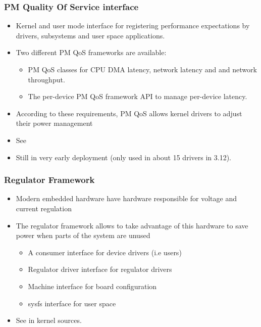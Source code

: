 \begin{frame}
  \frametitle{PM Quality Of Service interface}
  \begin{itemize}
  \item Kernel and user mode interface for registering
        performance expectations by drivers, subsystems and user space
        applications.
  \item Two different PM QoS frameworks are available:
    \begin{itemize}
       \item PM QoS classes for CPU DMA latency, network latency and
             and network throughput.
       \item The per-device PM QoS framework API to manage per-device
	     latency.
    \end{itemize}
  \item According to these requirements, PM QoS allows kernel drivers
        to adjust their power management
  \item See 
  \item Still in very early deployment (only used in about 15 drivers in
        3.12).
  \end{itemize}
\end{frame}

\begin{frame}
  \frametitle{Regulator Framework}
  \begin{itemize}
  \item Modern embedded hardware have hardware responsible for voltage
    and current regulation
  \item The regulator framework allows to take advantage of this
    hardware to save power when parts of the system are unused
    \begin{itemize}
    \item A consumer interface for device drivers (i.e users)
    \item Regulator driver interface for regulator drivers
    \item Machine interface for board configuration
    \item sysfs interface for user space
    \end{itemize}
  \item See  in kernel sources.
  \end{itemize}
\end{frame}

